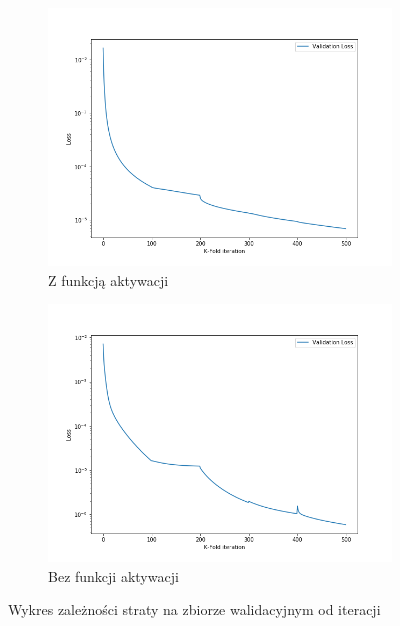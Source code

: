 \documentclass[12pt,a4paper]{article}
\begin{document}
\begin{figure}[h]
  \centering
\begin{subfigure}{0.5\textwidth}
  \includegraphics[width=\linewidth]{charts/activ_vs_noactiv/activ.png}
  \caption{Z funkcją aktywacji}
  \label{}
\end{subfigure}\hfil
\begin{subfigure}{0.5\textwidth}
  \includegraphics[width=\linewidth]{charts/activ_vs_noactiv/noactiv.png}
  \caption{Bez funkcji aktywacji}
  \label{}
\end{subfigure}
\caption{Wykres zależności straty na zbiorze walidacyjnym od iteracji}
\label{}
\end{figure}
\end{document}
